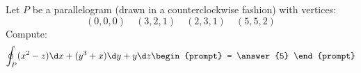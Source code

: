 \documentclass{ximera}
\author{Bart Snapp}
\begin{document}
\begin{exercise}
  Let $P$ be a parallelogram (drawn in a counterclockwise fashion)
  with vertices:
  \[
  (0,0,0)\quad (3,2,1)\quad (2,3,1) \quad (5,5,2)
  \]
  Compute:
  \[
  \oint_P (x^2-z) \d x + (y^3+x)\d y + y \d z
  \begin{prompt}
    = \answer{5}
  \end{prompt}
  \]
\end{exercise}
\end{document}
